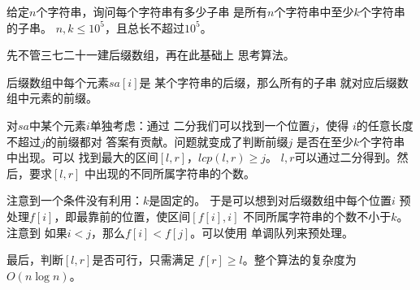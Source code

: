 \begin{prob}
	给定$n$个字符串，询问每个字符串有多少子串
	是所有$n$个字符串中至少$k$个字符串的子串。
	$n, k \le 10^5$，且总长不超过$10^5$。
\end{prob}

\begin{sol}
	先不管三七二十一建后缀数组，再在此基础上
	思考算法。\par
	后缀数组中每个元素$sa[i]$是
	某个字符串的后缀，那么所有的子串
	就对应后缀数组中元素的前缀。\par
	对$sa$中某个元素$i$单独考虑：通过
	二分我们可以找到一个位置$j$，使得
	$i$的任意长度不超过$j$的前缀都对
	答案有贡献。问题就变成了判断前缀$j$
	是否在至少$k$个字符串中出现。可以
	找到最大的区间$[l,r]$，$lcp(l,r) \ge j$。
	$l,r$可以通过二分得到。然后，要求$[l,r]$
	中出现的不同所属字符串的个数。\par
	注意到一个条件没有利用：$k$是固定的。
	于是可以想到对后缀数组中每个位置$i$
	预处理$f[i]$，即最靠前的位置，使区间$[f[i],i]$
	不同所属字符串的个数不小于$k$。注意到
	如果$i<j$，那么$f[i] < f[j]$。可以使用
	单调队列来预处理。
	\par 最后，判断$[l,r]$是否可行，只需满足
	$f[r] \ge l$。整个算法的复杂度为$O(n \log n)$。
\end{sol}
